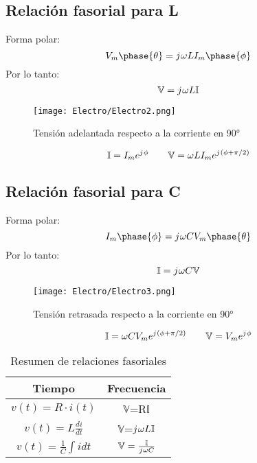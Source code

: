 \documentclass[
	12pt, %
	fleqn, %
	a4paper, %
	oneside, %
]{LegrandOrangeBook}
\begin{document}
\subsection{Relación fasorial para L}
Forma polar:
\begin{displaymath}
V_m\phase{\theta}=\iu\omega LI_m\phase{\phi}
\end{displaymath}
Por lo tanto:
\begin{displaymath}
\mathbb{V}={j\mkern1mu}\omega L\mathbb{I}
\end{displaymath}
\begin{figure}[H]
\centering
\texttt{[image: Electro/Electro2.png]}
\caption{Tensión adelantada respecto a la corriente en 90°}
\end{figure}
\begin{equation*}
\mathbb{I}=I_me^{{j\mkern1mu}\phi}
\qquad
\mathbb{V}=\omega LI_me^{{j\mkern1mu}(\phi+\pi/2)}
\end{equation*}
\subsection{Relación fasorial para C}
Forma polar:
\begin{displaymath}
I_m\phase{\phi}=\iu\omega CV_m\phase{\theta}
\end{displaymath}
Por lo tanto:
\begin{displaymath}
\mathbb{I}={j\mkern1mu}\omega C\mathbb{V}
\end{displaymath}
\begin{figure}[H]
\centering
\texttt{[image: Electro/Electro3.png]}
\caption{Tensión retrasada respecto a la corriente en 90°}
\end{figure}
\begin{equation*}
\mathbb{I}=\omega CV_me^{{j\mkern1mu}(\phi+\pi/2)}
\qquad
\mathbb{V}=V_me^{{j\mkern1mu}\phi}
\end{equation*}
\begin{table}[H]
\begin{center}
\begin{tabular}{|c|c|}
\hline
\rowcolor[HTML]{34CDF9} 
Tiempo                     & Frecuencia                                  \\ \hline
$v(t)=R\cdot i(t)$         & $\mathbb{V}$=R$\mathbb{I}$                  \\ \hline
$v(t)=L\frac{di}{dt}$      & $\mathbb{V}$=${j\mkern1mu}\omega L\mathbb{I}$        \\ \hline
$v(t)=\frac{1}{C}\int idt$ & $\mathbb{V}=\frac{\mathbb{I}}{{j\mkern1mu}\omega C}$ \\ \hline
\end{tabular}
\end{center}
\caption{Resumen de relaciones fasoriales}
\end{table}
\end{document}
